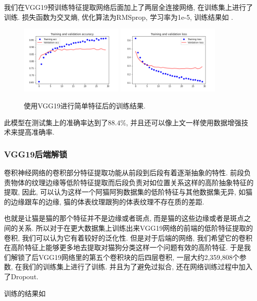 \documentclass[lang=cn,11pt]{elegantpaper}
\begin{document}
我们在VGG19预训练特征提取网络后面加上了两层全连接网络, 在训练集上进行了训练. 损失函数为交叉熵, 优化算法为RMSprop, 学习率为1e-5, 训练结果如 .
\begin{figure}[htbp]
	\centering
	  \includegraphics[width=0.45\textwidth]{VGG_classify_1}
	  \includegraphics[width=0.45\textwidth]{VGG_classify_2}
	  \caption{使用VGG19进行简单特征后的训练结果. \label{fig:ab1}}
	\end{figure}

此模型在测试集上的准确率达到了$88.4\%$, 并且还可以像上文一样使用数据增强技术来提高准确率. 
\subsubsection{VGG19后端解锁}

卷积神经网络的卷积部分特征提取功能从前段到后段有着逐渐抽象的特性. 前段负责物体的纹理边缘等低阶特征提取而后段负责对如位置关系这样的高阶抽象特征的提取, 因此, 可以认为这样一个阿猫阿狗数据集的低阶特征与其他数据集无异, 如猫的边缘跟车的边缘, 猫的体表纹理跟狗的体表纹理不存在质的差距. 

也就是让猫是猫的那个特征并不是边缘或者斑点, 而是猫的这些边缘或者是斑点之间的关系. 所以对于在更大数据集上训练出来VGG19网络的前端的低阶特征提取的卷积, 我们可以认为它有着较好的泛化性. 但是对于后端的网络, 我们希望它的卷积在高阶特征上能够更多地去提取对猫狗分类这样一个问题有效的高阶特征. 于是我们解锁了后VGG19网络里的第五个卷积块的后四层卷积, 一层大约2,359,808个参数, 在我们的训练集上进行了训练. 并且为了避免过拟合, 还在网络训练过程中加入了Dropout.

训练的结果如 
\end{document}
